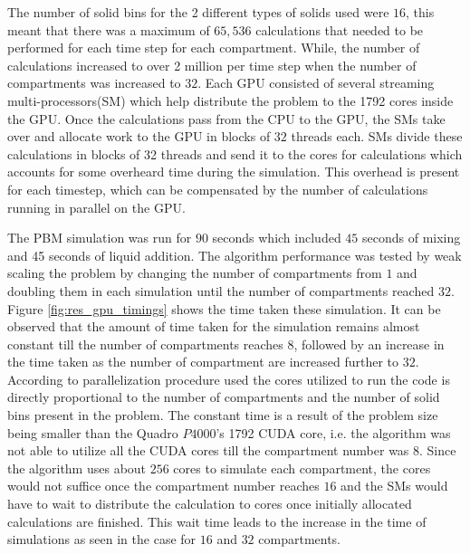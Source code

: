 \documentclass[preprint,10pt,authoryear,review]{elsarticle}
\begin{document}
The number of solid bins for the 2 different types of solids used were $16$, 
this meant that there was a maximum of $65,536$ calculations that needed to 
be performed for each time step for each compartment. While, the
number of calculations increased to over 2 million per time step when the number of 
compartments was increased to $32$. Each GPU consisted of several streaming 
multi-processors(SM) which help distribute the problem to the 1792 cores inside 
the GPU. Once the calculations  pass from the CPU to the GPU, the SMs take 
over and allocate work to the GPU in blocks of $32$ threads each. 
SMs divide these calculations in blocks 
of 32 threads and send it to the cores for calculations which accounts for some 
overheard time during the simulation. This overhead is present for each timestep, 
which can be compensated by the number of calculations running in parallel on 
the GPU. 

The PBM simulation was run for $90$ seconds which included $45$ seconds of mixing 
and 45 seconds of liquid addition. The algorithm performance was tested by weak scaling 
the problem by changing the number of compartments from $1$ and doubling them in 
each simulation until the number of compartments reached $32$. Figure \ref{fig:res_gpu_timings} 
shows the time taken these simulation. It can be observed that the amount of time taken 
for the simulation remains almost constant till the number of compartments reaches $8$, 
followed by an increase in the time taken as the number of compartment are increased 
further to $32$. According to parallelization procedure used the cores utilized to run the 
code is directly proportional to the number of compartments and the number of solid bins 
present in the problem. The constant time is a result of the problem size being smaller than 
the Quadro $P4000$'s 1792 CUDA core, i.e. the algorithm was not able to utilize all the 
CUDA cores till the compartment number was $8$. Since the algorithm uses about $256$ cores 
to simulate each compartment, the cores would not suffice once the compartment number reaches 
$16$ and the SMs would have to wait to distribute the calculation to cores once 
initially allocated calculations are finished. This wait time leads to the increase in the 
time of simulations as seen in the case for $16$ and $32$ compartments. 
\end{document}
